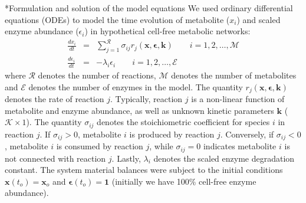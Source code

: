 \documentclass[12pt]{article}
\makeatletter
\renewcommand\subsection{\@startsection
	{subsection}{2}{0mm}
	{-0.05in}
	{-0.5\baselineskip}
	{\normalfont\normalsize\bfseries}}
\makeatother
\begin{document}
\subsection*{Formulation and solution of the model equations}
We used ordinary differential equations (ODEs) to model the time evolution of metabolite ($x_{i}$) and scaled enzyme abundance ($\epsilon_{i}$) in hypothetical cell-free metabolic networks:
\begin{eqnarray}
	\frac{dx_{i}}{dt} & = & \sum_{j=1}^{\mathcal{R}}\sigma_{ij}r_{j}\left(\mathbf{x},\mathbf{\epsilon},\mathbf{k}\right)\qquad{i=1,2,\hdots,\mathcal{M}}\\
	\frac{d\epsilon_{i}}{dt} & = & -\lambda_{i}\epsilon_{i}\qquad{i=1,2,\hdots,\mathcal{E}}
\end{eqnarray}where $\mathcal{R}$ denotes the number of reactions, $\mathcal{M}$ denotes the number of metabolites and $\mathcal{E}$ denotes the number of enzymes in the model.
The quantity $r_{j}\left(\mathbf{x},\mathbf{\epsilon},\mathbf{k}\right)$ denotes the rate of reaction $j$.
Typically, reaction $j$ is a non-linear function of metabolite and enzyme abundance, as well as unknown kinetic parameters $\mathbf{k}$ ($\mathcal{K}\times{1}$).
The quantity $\sigma_{ij}$ denotes the stoichiometric coefficient for species $i$ in reaction $j$.
If $\sigma_{ij}>0$, metabolite $i$ is produced by reaction $j$.
Conversely, if $\sigma_{ij}<0$, metabolite $i$ is consumed by reaction $j$, while $\sigma_{ij}=0$ indicates metabolite $i$ is not connected with reaction $j$.
Lastly, $\lambda_{i}$ denotes the scaled enzyme degradation constant.
The system material balances were subject to the initial conditions $\mathbf{x}\left(t_{o}\right)=\mathbf{x}_{o}$ and $\mathbf{\epsilon}\left(t_{o}\right)=\mathbf{1}$ (initially we have 100\% cell-free enzyme abundance).
\end{document}
